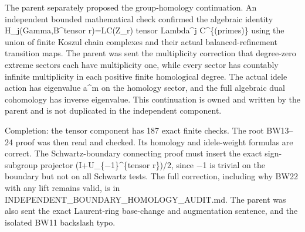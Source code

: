 \documentclass[
]{article}
\begin{document}
The parent separately proposed the group-homology continuation. An
independent bounded mathematical check confirmed the algebraic identity
H\_j(Gamma,B\^{}tensor r)=LC(Z\_r) tensor Lambda\^{}j C\^{}\{(primes)\}
using the union of finite Koszul chain complexes and their actual
balanced-refinement transition maps. The parent was sent the
multiplicity correction that degree-zero extreme sectors each have
multiplicity one, while every sector has countably infinite multiplicity
in each positive finite homological degree. The actual idele action has
eigenvalue \textbar a\textbar\^{}m on the homology sector, and the full
algebraic dual cohomology has inverse eigenvalue. This continuation is
owned and written by the parent and is not duplicated in the independent
component.

Completion: the tensor component has 187 exact finite checks. The root
BW13--24 proof was then read and checked. Its homology and idele-weight
formulas are correct. The Schwartz-boundary connecting proof must insert
the exact sign-subgroup projector (I+U\_\{−1\}\^{}\{tensor r\})/2, since
−1 is trivial on the boundary but not on all Schwartz tests. The full
correction, including why BW22 with any lift remains valid, is in
INDEPENDENT\_BOUNDARY\_HOMOLOGY\_AUDIT.md. The parent was also sent the
exact Laurent-ring base-change and augmentation sentence, and the
isolated BW11 backslash typo.
\end{document}
